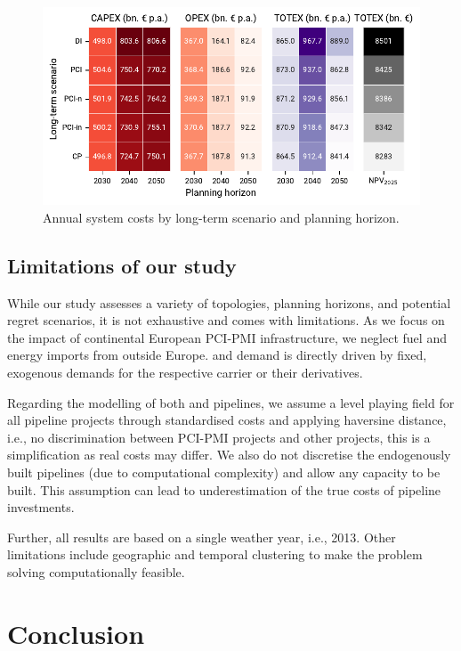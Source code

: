 \documentclass[preprint,12pt,sort&compress]{elsarticle}
\begin{document}
\begin{figure}[htbp]
  \centering
  \includegraphics[width=\textwidth]{totex_heatmap.pdf}
  \caption{Annual system costs by long-term scenario and planning horizon.}
  \label{fig:totex_heatmap}
\end{figure}

\clearpage

\subsection{Limitations of our study}
\label{sec:limitations}
While our study assesses a variety of topologies, planning horizons, and potential regret scenarios, it is not exhaustive and comes with limitations.
As we focus on the impact of continental European PCI-PMI infrastructure, we neglect fuel and energy imports from outside Europe.  and  demand is directly driven by fixed, exogenous demands for the respective carrier or their derivatives.

Regarding the modelling of both  and  pipelines, we assume a level playing field for all pipeline projects through standardised costs and applying haversine distance, i.e., no discrimination between PCI-PMI projects and other projects, this is a simplification as real costs may differ. We also do not discretise the endogenously built pipelines (due to computational complexity) and allow any capacity to be built. This assumption can lead to underestimation of the true costs of pipeline investments.

Further, all results are based on a single weather year, i.e., 2013.
Other limitations include geographic and temporal clustering to make the problem solving computationally feasible.
\section{Conclusion}
\label{sec:conclusion}
\end{document}
